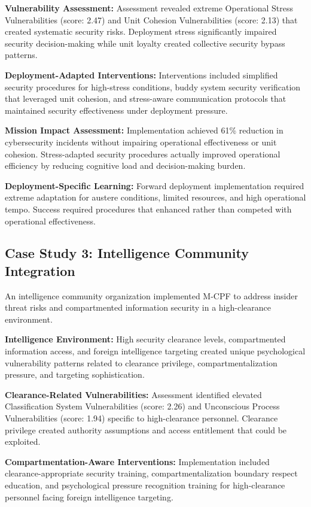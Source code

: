 \documentclass[10pt, twocolumn]{article}
\begin{document}
\textbf{Vulnerability Assessment:} Assessment revealed extreme Operational Stress Vulnerabilities (score: 2.47) and Unit Cohesion Vulnerabilities (score: 2.13) that created systematic security risks. Deployment stress significantly impaired security decision-making while unit loyalty created collective security bypass patterns.

\textbf{Deployment-Adapted Interventions:} Interventions included simplified security procedures for high-stress conditions, buddy system security verification that leveraged unit cohesion, and stress-aware communication protocols that maintained security effectiveness under deployment pressure.

\textbf{Mission Impact Assessment:} Implementation achieved 61\% reduction in cybersecurity incidents without impairing operational effectiveness or unit cohesion. Stress-adapted security procedures actually improved operational efficiency by reducing cognitive load and decision-making burden.

\textbf{Deployment-Specific Learning:} Forward deployment implementation required extreme adaptation for austere conditions, limited resources, and high operational tempo. Success required procedures that enhanced rather than competed with operational effectiveness.

\subsection{Case Study 3: Intelligence Community Integration}

An intelligence community organization implemented M-CPF to address insider threat risks and compartmented information security in a high-clearance environment.

\textbf{Intelligence Environment:} High security clearance levels, compartmented information access, and foreign intelligence targeting created unique psychological vulnerability patterns related to clearance privilege, compartmentalization pressure, and targeting sophistication.

\textbf{Clearance-Related Vulnerabilities:} Assessment identified elevated Classification System Vulnerabilities (score: 2.26) and Unconscious Process Vulnerabilities (score: 1.94) specific to high-clearance personnel. Clearance privilege created authority assumptions and access entitlement that could be exploited.

\textbf{Compartmentation-Aware Interventions:} Implementation included clearance-appropriate security training, compartmentalization boundary respect education, and psychological pressure recognition training for high-clearance personnel facing foreign intelligence targeting.
\end{document}
